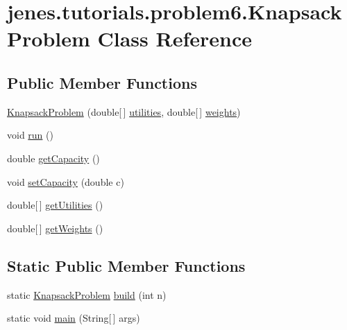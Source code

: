 \hypertarget{classjenes_1_1tutorials_1_1problem6_1_1_knapsack_problem}{\section{jenes.\-tutorials.\-problem6.\-Knapsack\-Problem Class Reference}
\label{classjenes_1_1tutorials_1_1problem6_1_1_knapsack_problem}
}
\subsection*{Public Member Functions}
\begin{DoxyCompactItemize}
\item 
\hyperlink{classjenes_1_1tutorials_1_1problem6_1_1_knapsack_problem_a5c921b1c3d9dbbe35decc777cf59169d}{Knapsack\-Problem} (double\mbox{[}$\,$\mbox{]} \hyperlink{classjenes_1_1tutorials_1_1problem6_1_1_knapsack_problem_acad1c415f8d164b4ffa0d99db5fc6772}{utilities}, double\mbox{[}$\,$\mbox{]} \hyperlink{classjenes_1_1tutorials_1_1problem6_1_1_knapsack_problem_a1c7f18379c5ca910013fc02748a53bf9}{weights})
\item 
void \hyperlink{classjenes_1_1tutorials_1_1problem6_1_1_knapsack_problem_a174433680cf824c4238f690d84a43e38}{run} ()
\item 
double \hyperlink{classjenes_1_1tutorials_1_1problem6_1_1_knapsack_problem_af5b99c0408de24f2d7598f14dc597ef7}{get\-Capacity} ()
\item 
void \hyperlink{classjenes_1_1tutorials_1_1problem6_1_1_knapsack_problem_a9caf9c53d4ce0e4b17ceb163ee8ab837}{set\-Capacity} (double c)
\item 
double\mbox{[}$\,$\mbox{]} \hyperlink{classjenes_1_1tutorials_1_1problem6_1_1_knapsack_problem_a1eddd1274f86fe1b3e61668f072dc364}{get\-Utilities} ()
\item 
double\mbox{[}$\,$\mbox{]} \hyperlink{classjenes_1_1tutorials_1_1problem6_1_1_knapsack_problem_a3f94e77e8f2ea920b9ec1dede3ed53f8}{get\-Weights} ()
\end{DoxyCompactItemize}
\subsection*{Static Public Member Functions}
\begin{DoxyCompactItemize}
\item 
static \hyperlink{classjenes_1_1tutorials_1_1problem6_1_1_knapsack_problem}{Knapsack\-Problem} \hyperlink{classjenes_1_1tutorials_1_1problem6_1_1_knapsack_problem_aa51d99e0afc8f76e96448bf45d9f412f}{build} (int n)
\item 
static void \hyperlink{classjenes_1_1tutorials_1_1problem6_1_1_knapsack_problem_ae706a456c3248ec8360f10138d364c3e}{main} (String\mbox{[}$\,$\mbox{]} args)
\end{DoxyCompactItemize}
